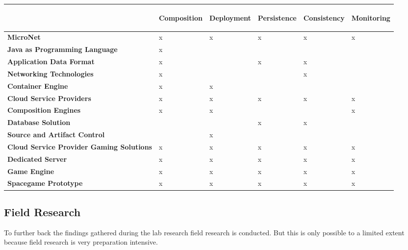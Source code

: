 \begin{center}
  \begin{tabular}{ l | l | l | l | l | l | }
    &\begin{turn}{90}\textbf{Composition}\end{turn}
    &\begin{turn}{90}\textbf{Deployment}\end{turn}
    &\begin{turn}{90}\textbf{Persistence}\end{turn}
    &\begin{turn}{90}\textbf{Consistency}\end{turn}
    &\begin{turn}{90}\textbf{Monitoring}\end{turn}
    \\\hline
    
    
    \textbf{MicroNet}&x&x&x&x&x\\\hline
    \textbf{Java as Programming Language}&x&&&&\\\hline
    \textbf{Application Data Format}&x&&x&x&\\\hline
    \textbf{Networking Technologies}&x&&&x&\\\hline
    \textbf{Container Engine}&x&x&&&\\\hline
    \textbf{Cloud Service Providers}&x&x&x&x&x\\\hline
    \textbf{Composition Engines}&x&x&&&x\\\hline
    \textbf{Database Solution}&&&x&x&\\\hline
    \textbf{Source and Artifact Control}&&x&&&\\\hline
    \textbf{Cloud Service Provider Gaming Solutions}&x&x&x&x&x\\\hline
    \textbf{Dedicated Server}&x&x&x&x&x\\\hline
    \textbf{Game Engine}&x&x&x&x&x\\\hline
    \textbf{Spacegame Prototype}&x&x&x&x&x\\\hline
  \end{tabular}
\end{center}

\subsection{Field Research}

To further back the findings gathered during the lab research field research is
conducted. But this is only possible to a limited extent because field research
is very preparation intensive. 

